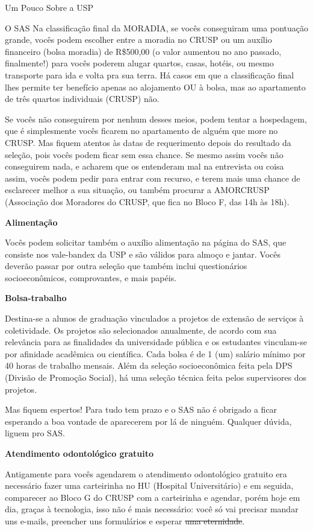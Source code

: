 \begin{secao}{Um Pouco Sobre a USP}
\begin{subsecao}{O SAS}
Na classificação final da MORADIA, se vocês conseguiram uma pontuação grande, vocês
podem escolher entre a moradia no CRUSP ou um auxílio financeiro (bolsa moradia)
de R\$500,00 (o valor aumentou no ano passado, finalmente!) para vocês poderem alugar       %
quartos, casas, hotéis, ou mesmo transporte para ida e volta pra sua terra. Há casos
em que a classificação final lhes permite ter benefício apenas ao alojamento OU à
bolsa, mas ao apartamento de três quartos individuais (CRUSP) não.

Se vocês não conseguirem por nenhum desses meios, podem tentar a hospedagem, que é
simplesmente vocês ficarem no apartamento de alguém que more no CRUSP. Mas fiquem
atentos às datas de requerimento depois do resultado da seleção, pois vocês podem
ficar sem essa chance. Se mesmo assim vocês não conseguirem nada,
e acharem que os entenderam mal na entrevista ou coisa assim, vocês podem pedir para
entrar com recurso, e terem mais uma chance de esclarecer melhor a sua situação, ou também
procurar a AMORCRUSP (Associação dos Moradores do CRUSP, que fica no Bloco F, das 14h às 18h).

{\bf Alimentação}

Vocês podem solicitar também o auxílio alimentação na página do SAS, que
consiste nos vale-bandex da USP e são válidos para almoço e jantar. Vocês deverão
passar por outra seleção que também inclui questionários socioeconômicos,
comprovantes, e mais papéis.

{\bf Bolsa-trabalho}

Destina-se a alunos de graduação vinculados a projetos de extensão de serviços à
coletividade. Os projetos são selecionados anualmente, de acordo com sua relevância
para as finalidades da universidade pública e os estudantes vinculam-se por
afinidade acadêmica ou científica. Cada bolsa é de 1 (um) salário mínimo por
40 horas de trabalho mensais. Além da seleção socioeconômica feita pela
DPS (Divisão de Promoção Social), há uma seleção técnica feita pelos supervisores
dos projetos.

Mas fiquem espertos! Para tudo tem prazo e o SAS não é obrigado a ficar esperando a
boa vontade de aparecerem por lá de ninguém. Qualquer dúvida, liguem pro SAS.

{\bf Atendimento odontológico gratuito}

Antigamente para vocês agendarem o atendimento odontológico gratuito era necessário fazer uma
carteirinha no HU (Hospital Universitário) e em seguida, comparecer ao Bloco G
do CRUSP com a carteirinha e agendar, porém hoje em dia, graças à tecnologia,
isso não é mais necessário: você só vai precisar mandar uns e-mails, preencher uns
formulários e esperar \sout{uma eternidade}.


\end{subsecao}
\end{secao}
